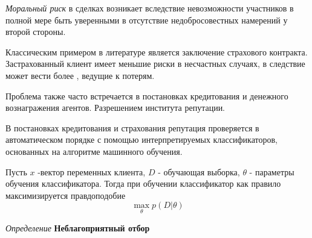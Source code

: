 \textit{Моральный  риск} в сделках возникает вследствие невозможности участников в полной мере быть уверенными в отсутствие недобросовестных намерений у второй стороны.

Классическим примером в литературе является заключение страхового контракта. Застрахованный клиент имеет меньшие риски в несчастных случаях, в следствие может вести более , ведущие к потерям.

Проблема также часто встречается в постановках кредитования и денежного вознагражения агентов. Разрешением института репутации. 

В постановках кредитования и страхования репутация проверяется в автоматическом порядке с помощью интерпретируемых классификаторов, основанных на алгоритме машинного обучения.

Пусть $x$ -вектор переменных клиента, $D$ - обучающая выборка,  $\theta$ -  параметры обучения классификатора. Тогда при обучении классификатор как правило максимизируется правдоподобие
$$
    \max_\theta  p(D|\theta) 
$$


\textit{Определение} \textbf{Неблагоприятный отбор}  \cite{akerlof1978market}